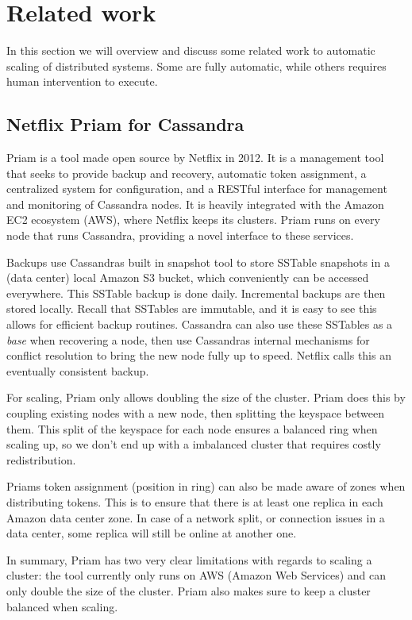 \section{Related work}
\label{sec:related_work}
In this section we will overview and discuss some related work to automatic scaling of distributed systems. Some are fully automatic, while others requires human intervention to execute.

\subsection{Netflix Priam for Cassandra}
Priam is a tool made open source by Netflix in 2012. It is a management tool that seeks to provide backup and recovery, automatic token assignment, a centralized system for configuration, and a RESTful interface for management and monitoring of Cassandra nodes. It is heavily integrated with the Amazon EC2 ecosystem (AWS), where Netflix keeps its clusters.
Priam runs on every node that runs Cassandra, providing a novel interface to these services.

Backups use Cassandras built in snapshot tool to store SSTable snapshots in a (data center) local Amazon S3 bucket, which conveniently can be accessed everywhere.
This SSTable backup is done daily. Incremental backups are then stored locally. Recall that SSTables are immutable, and it is easy to see this allows for efficient backup routines. Cassandra can also use these SSTables as a \emph{base} when recovering a node, then use Cassandras internal mechanisms for conflict resolution to bring the new node fully up to speed. Netflix calls this an eventually consistent backup.

For scaling, Priam only allows doubling the size of the cluster. Priam does this by coupling existing nodes with a new node, then splitting the keyspace between them. This split of the keyspace for each node ensures a balanced ring when scaling up, so we don't end up with a imbalanced cluster that requires costly redistribution.

Priams token assignment (position in ring) can also be made aware of zones when distributing tokens. This is to ensure that there is at least one replica in each Amazon data center zone. In case of a network split, or connection issues in a data center, some replica will still be online at another one.

In summary, Priam has two very clear limitations with regards to scaling a cluster: the tool currently only runs on AWS (Amazon Web Services) and can only double the size of the cluster. Priam also makes sure to keep a cluster balanced when scaling.


